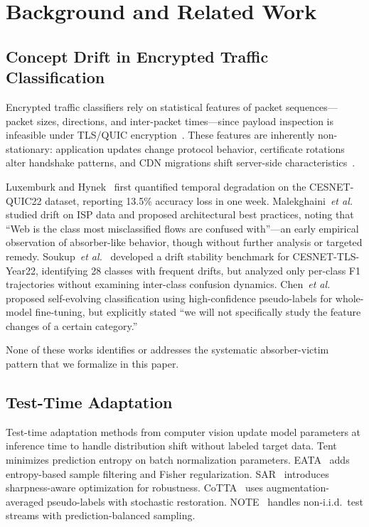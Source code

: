\documentclass[journal]{IEEEtran}
\newcommand{\etal}{\textit{et al.}}
\begin{document}
\section{Background and Related Work}
\label{sec:related}

\subsection{Concept Drift in Encrypted Traffic Classification}

Encrypted traffic classifiers rely on statistical features of packet sequences---packet sizes, directions, and inter-packet times---since payload inspection is infeasible under TLS/QUIC encryption~\cite{luxemburk2023quic}.
These features are inherently non-stationary: application updates change protocol behavior, certificate rotations alter handshake patterns, and CDN migrations shift server-side characteristics~\cite{soukup2025drift, malekghaini2023drift}.

Luxemburk and Hynek~\cite{luxemburk2023quic} first quantified temporal degradation on the CESNET-QUIC22 dataset, reporting 13.5\% accuracy loss in one week.
Malekghaini~\etal{}~\cite{malekghaini2023drift} studied drift on ISP data and proposed architectural best practices, noting that ``Web is the class most misclassified flows are confused with''---an early empirical observation of absorber-like behavior, though without further analysis or targeted remedy.
Soukup~\etal{}~\cite{soukup2025drift} developed a drift stability benchmark for CESNET-TLS-Year22, identifying 28 classes with frequent drifts, but analyzed only per-class F1 trajectories without examining inter-class confusion dynamics.
Chen~\etal{}~\cite{chen2025selfevolving} proposed self-evolving classification using high-confidence pseudo-labels for whole-model fine-tuning, but explicitly stated ``we will not specifically study the feature changes of a certain category.''

None of these works identifies or addresses the systematic absorber-victim pattern that we formalize in this paper.

\subsection{Test-Time Adaptation}

Test-time adaptation methods from computer vision update model parameters at inference time to handle distribution shift without labeled target data.
Tent~\cite{wang2021tent} minimizes prediction entropy on batch normalization parameters.
EATA~\cite{niu2022eata} adds entropy-based sample filtering and Fisher regularization.
SAR~\cite{niu2023sar} introduces sharpness-aware optimization for robustness.
CoTTA~\cite{wang2022cotta} uses augmentation-averaged pseudo-labels with stochastic restoration.
NOTE~\cite{gong2022note} handles non-i.i.d.\ test streams with prediction-balanced sampling.
\end{document}
